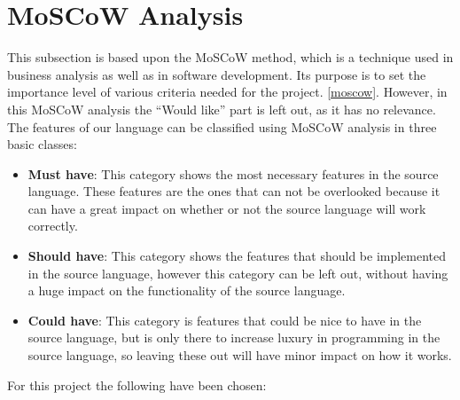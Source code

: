 \section{MoSCoW Analysis}\label{analysis:moscow}
This subsection is based upon the MoSCoW method, which is a technique used in business analysis as well as in software development. Its purpose is to set the importance level of various criteria needed for the project. \ref{moscow}. However, in this MoSCoW analysis the ``Would like'' part is left out, as it has no relevance. \\

The features of our language can be classified using MoSCoW analysis in three basic classes:
\begin{itemize}
\item \textbf{Must have}: This category shows the most necessary features in the source language. These features are the ones that can not be overlooked because it can have a great impact on whether or not the source language will
work correctly. 

\item \textbf{Should have}: This category shows the features that should be implemented in the source language, however this category can be left out, without having a huge impact on the functionality of the source language. 

\item \textbf{Could have}: This category is features that could be nice to have in the source language, but is only there to increase luxury in programming in the source language, so leaving these out will have minor impact on how it works. 
\end{itemize}


For this project the following have been chosen:\\

